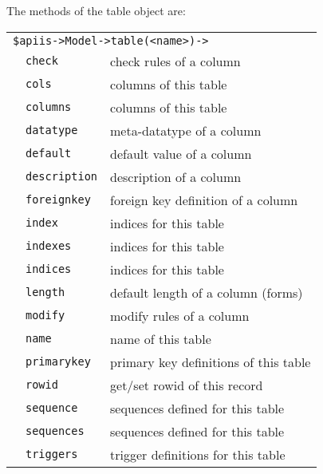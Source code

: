 The methods of the table object are:

\smallskip
\begin{tabular}{rl|l}
\multicolumn{3}{l}{\texttt{\$apiis->Model->table(<name>)->}}       \\
                                     &\verb+check+       & check rules of a column \\
                                     &\verb+cols+        & columns of this table \\
                                     &\verb+columns+     & columns of this table \\
                                     &\verb+datatype+    & meta-datatype of a column \\
                                     &\verb+default+     & default value of a column \\
                                     &\verb+description+ & description of a column \\
                                     &\verb+foreignkey+  & foreign key definition of a column \\
                                     &\verb+index+       & indices for this table \\
                                     &\verb+indexes+     & indices for this table \\
                                     &\verb+indices+     & indices for this table \\
                                     &\verb+length+      & default length of a column (forms) \\
                                     &\verb+modify+      & modify rules of a column \\
                                     &\verb+name+        & name of this table \\
                                     &\verb+primarykey+  & primary key definitions of this table \\
                                     &\verb+rowid+       & get/set rowid of this record \\
                                     &\verb+sequence+    & sequences defined for this table \\
                                     &\verb+sequences+   & sequences defined for this table \\
                                     &\verb+triggers+    & trigger definitions for this table \\
\end{tabular}
\medskip

